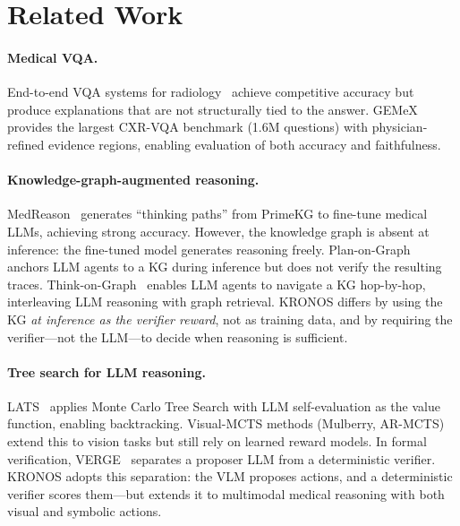 \documentclass[runningheads]{llncs}
\begin{document}
\section{Related Work}
\label{sec:related}

\paragraph{Medical VQA.}
End-to-end VQA systems for radiology~\cite{li2024llavamed, liu2025gemex}
achieve competitive accuracy but produce explanations that are
not structurally tied to the answer.
GEMeX~\cite{liu2025gemex} provides the largest CXR-VQA benchmark
(1.6M questions) with physician-refined evidence regions, enabling
evaluation of both accuracy and faithfulness.

\paragraph{Knowledge-graph-augmented reasoning.}
MedReason~\cite{wang2025medreason} generates ``thinking paths'' from
PrimeKG to fine-tune medical LLMs, achieving strong accuracy.
However, the knowledge graph is absent at inference: the fine-tuned model
generates reasoning freely.
Plan-on-Graph~\cite{chen2024planonGraph} anchors LLM agents to a KG
during inference but does not verify the resulting traces.
Think-on-Graph~\cite{sun2024thinkongraph} enables LLM agents to navigate a
KG hop-by-hop, interleaving LLM reasoning with graph retrieval.
KRONOS differs by using the KG \emph{at inference as the verifier reward},
not as training data, and by requiring the verifier---not the LLM---to
decide when reasoning is sufficient.

\paragraph{Tree search for LLM reasoning.}
LATS~\cite{zhou2024lats} applies Monte Carlo Tree Search with LLM
self-evaluation as the value function, enabling backtracking.
Visual-MCTS methods (Mulberry, AR-MCTS) extend this to vision tasks but
still rely on learned reward models.
In formal verification, VERGE~\cite{singh2025verge} separates a proposer LLM
from a deterministic verifier.
KRONOS adopts this separation: the VLM proposes actions, and a
deterministic verifier scores them---but extends it to multimodal medical
reasoning with both visual and symbolic actions.
\end{document}

